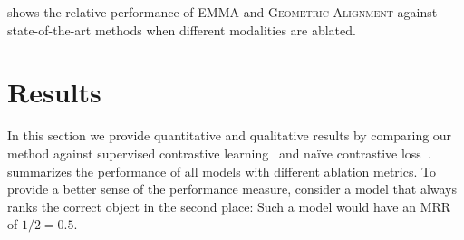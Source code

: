 \documentclass[10pt]{article} %
\newcommand{\ours}{\textsc{EMMA}}
\newcommand{\geom}{\textsc{Geometric Alignment}}
\begin{document}
 shows the relative performance of \ours{} and \geom{} against state-of-the-art methods when different modalities are ablated.


\section{Results}
\label{sec:results}

In this section we provide quantitative and qualitative results by comparing our method against supervised contrastive learning~\citep{NEURIPS2020_supervised_contrastive} and na\"ive contrastive loss~\citep{chen2020simple}.
 summarizes the performance of all models with different ablation metrics.
To provide a better sense of the performance measure, consider a model that always ranks the correct object in the second place: Such a model would have an MRR of $1/2 = 0.5$.
\end{document}
